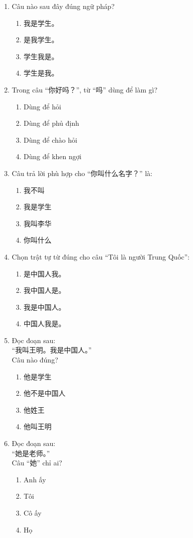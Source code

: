 \documentclass{article}
\begin{document}
\begin{CJK*}{UTF8}{gbsn}
\begin{multicols}{2}
\begin{enumerate}[label=\textbf{Câu \arabic*.}, leftmargin=*, itemsep=1.2em]
\item Câu nào sau đây đúng ngữ pháp?
\begin{enumerate}[label=A.]
\item 我是学生。
\item 是我学生。
\item 学生我是。
\item 学生是我。
\end{enumerate}

\item Trong câu “你好吗？”, từ “吗” dùng để làm gì?
\begin{enumerate}[label=A.]
\item Dùng để hỏi
\item Dùng để phủ định
\item Dùng để chào hỏi
\item Dùng để khen ngợi
\end{enumerate}

\item Câu trả lời phù hợp cho “你叫什么名字？” là:
\begin{enumerate}[label=A.]
\item 我不叫
\item 我是学生
\item 我叫李华
\item 你叫什么
\end{enumerate}

\item Chọn trật tự từ đúng cho câu “Tôi là người Trung Quốc”:
\begin{enumerate}[label=A.]
\item 是中国人我。
\item 我中国人是。
\item 我是中国人。
\item 中国人我是。
\end{enumerate}

\item Đọc đoạn sau: \\
“我叫王明。我是中国人。” \\
Câu nào đúng?
\begin{enumerate}[label=A.]
\item 他是学生
\item 他不是中国人
\item 他姓王
\item 他叫王明
\end{enumerate}

\item Đọc đoạn sau: \\
“她是老师。” \\
Câu “她” chỉ ai?
\begin{enumerate}[label=A.]
\item Anh ấy
\item Tôi
\item Cô ấy
\item Họ
\end{enumerate}


\end{enumerate}
\end{multicols}
\end{CJK*}
\end{document}

